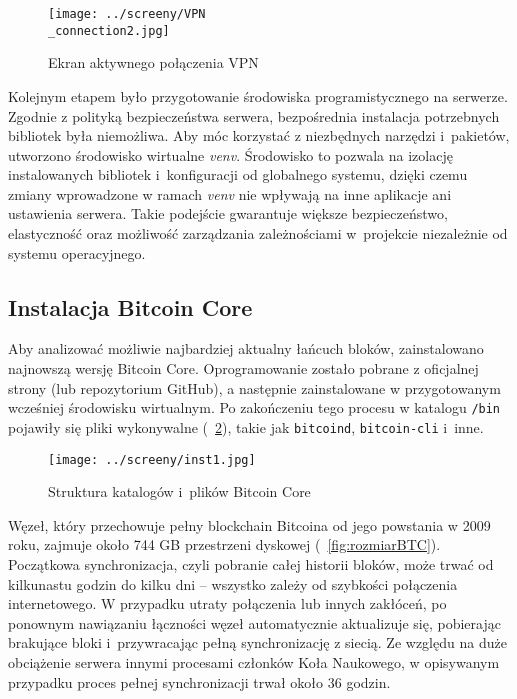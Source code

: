 \documentclass[12pt,a4paper]{report}
\theoremstyle{definition} %
\begin{document}
	\begin{figure}[H]
	    \centering
	    \texttt{[image: ../screeny/VPN\\\_connection2.jpg]} 
	    \caption{Ekran aktywnego połączenia VPN}
	    \label{fig:ekran2}
	\end{figure}

	Kolejnym etapem było przygotowanie środowiska programistycznego na serwerze. Zgodnie z polityką bezpieczeństwa serwera, bezpośrednia instalacja potrzebnych bibliotek była niemożliwa. Aby móc korzystać z niezbędnych narzędzi i~pakietów, utworzono środowisko wirtualne \textit{venv}. Środowisko to pozwala na izolację instalowanych bibliotek i~konfiguracji od globalnego systemu, dzięki czemu zmiany wprowadzone w ramach \textit{venv} nie wpływają na inne aplikacje ani ustawienia serwera. Takie podejście gwarantuje większe bezpieczeństwo, elastyczność oraz możliwość zarządzania zależnościami w~projekcie niezależnie od systemu operacyjnego.

	\subsection{Instalacja Bitcoin Core}
\hspace*{\parindent}Aby analizować możliwie najbardziej aktualny łańcuch bloków, zainstalowano najnowszą wersję Bitcoin Core. Oprogramowanie zostało pobrane z oficjalnej strony (lub repozytorium GitHub), a następnie zainstalowane w przygotowanym wcześniej środowisku wirtualnym. Po zakończeniu tego procesu w katalogu \texttt{/bin} pojawiły się pliki wykonywalne (\figurename~\ref{fig:strukturaBCore}), takie jak \texttt{bitcoind}, \texttt{bitcoin-cli} i~inne.

	\begin{figure}[H]
	    \centering
	    \texttt{[image: ../screeny/inst1.jpg]} 
	    \caption{Struktura katalogów i~plików Bitcoin Core}
	    \label{fig:strukturaBCore}
	\end{figure}

	Węzeł, który przechowuje pełny blockchain Bitcoina od jego powstania w 2009 roku, zajmuje około 744 GB przestrzeni dyskowej (\figurename~\ref{fig:rozmiarBTC}). Początkowa synchronizacja, czyli pobranie całej historii bloków, może trwać od kilkunastu godzin do kilku dni – wszystko zależy od szybkości połączenia internetowego. W przypadku 			utraty połączenia lub innych zakłóceń, po ponownym nawiązaniu łączności węzeł automatycznie aktualizuje się, pobierając brakujące bloki i~przywracając pełną synchronizację z siecią. Ze względu na duże obciążenie serwera innymi procesami członków Koła Naukowego, w opisywanym przypadku proces pełnej synchronizacji trwał około 36 godzin.
\end{document}
